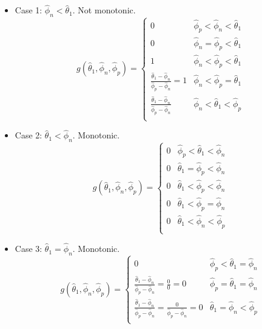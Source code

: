 \documentclass[AMA,STIX1COL]{WileyNJD-v2}
\begin{document}
\begin{itemize}
	\item Case 1: \( \hat{\phi}_n < \hat{\theta}_1 \). Not monotonic. \\
\begin{equation} 
g(\hat{\theta}_1, \hat{\phi}_n, \hat{\phi}_p)
=
\left\{ 
\begin{array}{ll}
0 & \hat{\phi}_p < \hat{\phi}_n < \hat{\theta}_1  \\
0 & \hat{\phi}_n = \hat{\phi}_p < \hat{\theta}_1 \\
1 &	\hat{\phi}_n < \hat{\phi}_p < \hat{\theta}_1 \\
\frac{\hat{\theta}_1 - \hat{\phi}_n}{\hat{\phi}_p - \hat{\phi}_n} = 1 & \hat{\phi}_n < \hat{\phi}_p = \hat{\theta}_1 \\
\frac{\hat{\theta}_1 - \hat{\phi}_n}{\hat{\phi}_p - \hat{\phi}_n} & \hat{\phi}_n < \hat{\theta}_1 < \hat{\phi}_p \\
\end{array}
\right.
\end{equation}

\item Case 2: \( \hat{\theta}_1 < \hat{\phi}_n \). Monotonic. \\
\begin{equation} 
g(\hat{\theta}_1, \hat{\phi}_n, \hat{\phi}_p)
=
\left\{ 
\begin{array}{ll}
0 & \hat{\phi}_p < \hat{\theta}_1 < \hat{\phi}_n  \\
0 & \hat{\theta}_1 = \hat{\phi}_p < \hat{\phi}_n \\
0 &	\hat{\theta}_1 < \hat{\phi}_p < \hat{\phi}_n \\
0 & \hat{\theta}_1 < \hat{\phi}_p = \hat{\phi}_n \\
0 & \hat{\theta}_1 < \hat{\phi}_n < \hat{\phi}_p \\
\end{array}
\right.
\end{equation}

\item Case 3: \( \hat{\theta}_1 = \hat{\phi}_n \). Monotonic. \\
\begin{equation} 
g(\hat{\theta}_1, \hat{\phi}_n, \hat{\phi}_p)
=
\left\{ 
\begin{array}{ll}
0 & \hat{\phi}_p < \hat{\theta}_1 = \hat{\phi}_n	\\
\frac{\hat{\theta}_1 - \hat{\phi}_n}{\hat{\phi}_p - \hat{\phi}_n} = \frac{0}{0} = 0 & \hat{\phi}_p = \hat{\theta}_1 = \hat{\phi}_n 	\\
\frac{\hat{\theta}_1 - \hat{\phi}_n}{\hat{\phi}_p - \hat{\phi}_n} = \frac{0}{\hat{\phi}_p - \hat{\phi}_n} = 0 & \hat{\theta}_1 = \hat{\phi}_n < \hat{\phi}_p	\\
\end{array}
\right.
\end{equation}
\end{itemize}
\end{document}
